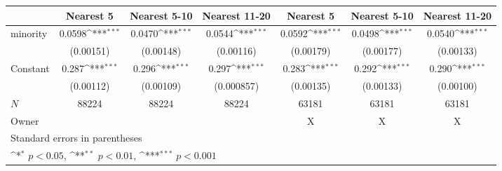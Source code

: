 {
\def\sym#1{\ifmmode^{#1}\else\(^{#1}\)\fi}
\begin{tabular}{l*{6}{c}}
\hline\hline
            &\multicolumn{1}{c}{Nearest 5}&\multicolumn{1}{c}{Nearest 5-10}&\multicolumn{1}{c}{Nearest 11-20}&\multicolumn{1}{c}{Nearest 5}&\multicolumn{1}{c}{Nearest 5-10}&\multicolumn{1}{c}{Nearest 11-20}\\
\hline
minority    &      0.0598\sym{***}&      0.0470\sym{***}&      0.0544\sym{***}&      0.0592\sym{***}&      0.0498\sym{***}&      0.0540\sym{***}\\
            &   (0.00151)         &   (0.00148)         &   (0.00116)         &   (0.00179)         &   (0.00177)         &   (0.00133)         \\
[1em]
Constant    &       0.287\sym{***}&       0.296\sym{***}&       0.297\sym{***}&       0.283\sym{***}&       0.292\sym{***}&       0.290\sym{***}\\
            &   (0.00112)         &   (0.00109)         &  (0.000857)         &   (0.00135)         &   (0.00133)         &   (0.00100)         \\
\hline
\(N\)       &       88224         &       88224         &       88224         &       63181         &       63181         &       63181         \\
Owner       &                     &                     &                     &           X         &           X         &           X         \\
\hline\hline
\multicolumn{7}{l}{\footnotesize Standard errors in parentheses}\\
\multicolumn{7}{l}{\footnotesize \sym{*} \(p<0.05\), \sym{**} \(p<0.01\), \sym{***} \(p<0.001\)}\\
\end{tabular}
}
